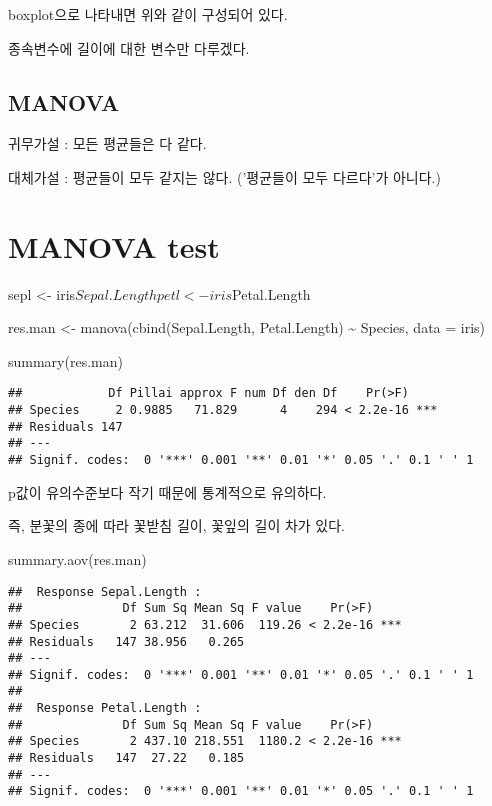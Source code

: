 \documentclass[
]{article}
\newenvironment{Shaded}{\begin{snugshade}}{\end{snugshade}}
\newcommand{\AttributeTok}[1]{\textcolor[rgb]{0.77,0.63,0.00}{#1}}
\newcommand{\FunctionTok}[1]{\textcolor[rgb]{0.00,0.00,0.00}{#1}}
\newcommand{\NormalTok}[1]{#1}
\newcommand{\OtherTok}[1]{\textcolor[rgb]{0.56,0.35,0.01}{#1}}
\newcommand{\SpecialCharTok}[1]{\textcolor[rgb]{0.00,0.00,0.00}{#1}}
\begin{document}
boxplot으로 나타내면 위와 같이 구성되어 있다.

종속변수에 길이에 대한 변수만 다루겠다.

\hypertarget{manova}{%
\subsection{MANOVA}\label{manova}}

귀무가설 : 모든 평균들은 다 같다.

대체가설 : 평균들이 모두 같지는 않다. ('평균들이 모두 다르다'가 아니다.)

\hypertarget{manova-test}{%
\section{MANOVA test}\label{manova-test}}

sepl \textless- iris\(Sepal.Length petl <- iris\)Petal.Length

\begin{Shaded}
\begin{Highlighting}[]
\NormalTok{res.man }\OtherTok{\textless{}{-}} \FunctionTok{manova}\NormalTok{(}\FunctionTok{cbind}\NormalTok{(Sepal.Length, Petal.Length) }\SpecialCharTok{\textasciitilde{}}\NormalTok{ Species, }\AttributeTok{data =}\NormalTok{ iris)}

\FunctionTok{summary}\NormalTok{(res.man)}
\end{Highlighting}
\end{Shaded}

\begin{verbatim}
##            Df Pillai approx F num Df den Df    Pr(>F)    
## Species     2 0.9885   71.829      4    294 < 2.2e-16 ***
## Residuals 147                                            
## ---
## Signif. codes:  0 '***' 0.001 '**' 0.01 '*' 0.05 '.' 0.1 ' ' 1
\end{verbatim}

p값이 유의수준보다 작기 때문에 통계적으로 유의하다.

즉, 분꽃의 종에 따라 꽃받침 길이, 꽃잎의 길이 차가 있다.

\begin{Shaded}
\begin{Highlighting}[]
\FunctionTok{summary.aov}\NormalTok{(res.man)}
\end{Highlighting}
\end{Shaded}

\begin{verbatim}
##  Response Sepal.Length :
##              Df Sum Sq Mean Sq F value    Pr(>F)    
## Species       2 63.212  31.606  119.26 < 2.2e-16 ***
## Residuals   147 38.956   0.265                      
## ---
## Signif. codes:  0 '***' 0.001 '**' 0.01 '*' 0.05 '.' 0.1 ' ' 1
## 
##  Response Petal.Length :
##              Df Sum Sq Mean Sq F value    Pr(>F)    
## Species       2 437.10 218.551  1180.2 < 2.2e-16 ***
## Residuals   147  27.22   0.185                      
## ---
## Signif. codes:  0 '***' 0.001 '**' 0.01 '*' 0.05 '.' 0.1 ' ' 1
\end{verbatim}
\end{document}
